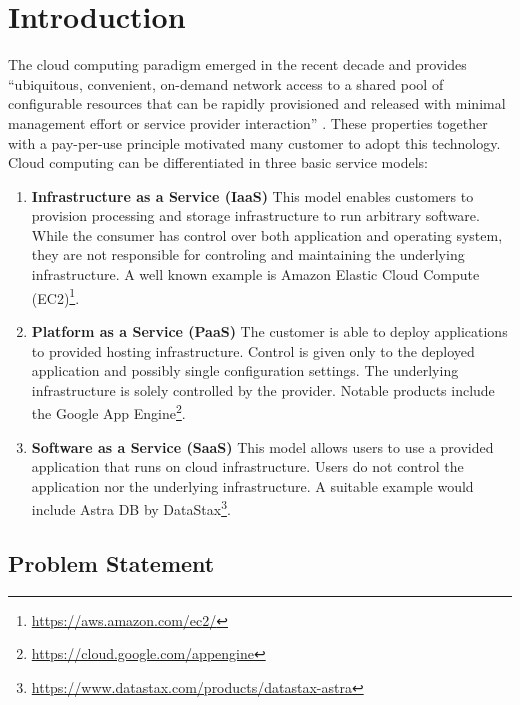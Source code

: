 \chapter{Introduction}
\label{ch:introduction}

The cloud computing paradigm emerged in the recent decade and provides ``ubiquitous, convenient, on-demand network access to a shared pool of configurable resources that can be rapidly provisioned and released with minimal management effort or service provider interaction'' \cite{mellNISTDefinitionCloud2011a}. These properties together with a pay-per-use principle motivated many customer to adopt this technology. Cloud computing can be differentiated in three basic service models:

\begin{enumerate}
    \item \textbf{Infrastructure as a Service (IaaS)} This model enables customers to provision processing and storage infrastructure to run arbitrary software. While the consumer has control over both application and operating system, they are not responsible for controling and maintaining the underlying infrastructure. A well known example is Amazon Elastic Cloud Compute (EC2)\footnote{\url{https://aws.amazon.com/ec2/}}.

    \item \textbf{Platform as a Service (PaaS)} The customer is able to deploy applications to provided hosting infrastructure. Control is given only to the deployed application and possibly single configuration settings. The underlying infrastructure is solely controlled by the provider. Notable products include the Google App Engine\footnote{\url{https://cloud.google.com/appengine}}.

    \item \textbf{Software as a Service (SaaS)} This model allows users to use a provided application that runs on cloud infrastructure. Users do not control the application nor the underlying infrastructure. A suitable example would include Astra DB by DataStax\footnote{\url{https://www.datastax.com/products/datastax-astra}}.
\end{enumerate}

\section{Problem Statement}
\label{sec:problem-statement}

